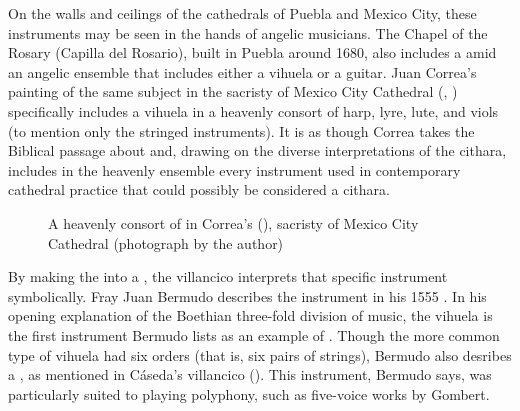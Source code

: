 
On the walls and ceilings of the cathedrals of Puebla and Mexico City, these
instruments may be seen in the hands of angelic musicians.
The Chapel of the Rosary (Capilla del Rosario), built in Puebla around 1680,
also includes a  amid an angelic ensemble
that includes either a vihuela or a guitar.
Juan Correa's painting of the same subject in the sacristy of Mexico City
Cathedral (, ) specifically includes a
vihuela in a heavenly consort of harp, lyre, lute, and viols (to mention only
the stringed instruments).
It is as though Correa takes the Biblical passage about  and, drawing on the diverse interpretations of
the cithara, includes in the heavenly ensemble every instrument used in
contemporary cathedral practice that could possibly be considered a cithara.


\begin{figure}
    \caption{A heavenly consort of  in Correa's
     (), sacristy of Mexico
    City Cathedral (photograph by the author)}
    \label{fig:Correa-Sacristy}
\end{figure}

By making the  into a , the villancico interprets
that specific instrument symbolically.
Fray Juan Bermudo describes the instrument in his 1555 .%
    \Autocite{Bermudo:Declaracion}
In his opening explanation of the Boethian three-fold division of music, the
vihuela is the first instrument Bermudo lists as an example of
 .
Though the more common type of vihuela had six orders (that is, six pairs of
strings), Bermudo also desribes a , as
mentioned in Cáseda's villancico ().%
    \Autocite[\folios{90\verso--110\recto}]{Bermudo:Declaracion}
This instrument, Bermudo says, was particularly suited to playing polyphony,
such as five-voice works by Gombert.



